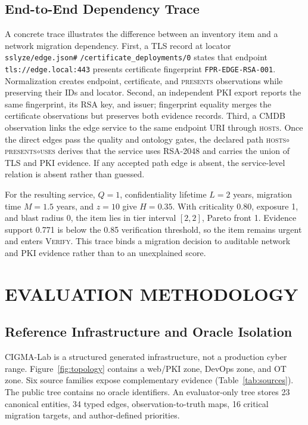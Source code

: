 \documentclass[a4paper,twoside]{article}
\newcommand{\rel}[1]{\textsc{#1}}          %
\newcommand{\verify}{\textsc{Verify}\xspace}
\begin{document}
\subsection{End-to-End Dependency Trace}

A concrete trace illustrates the difference between an inventory item and a network migration dependency. First, a TLS record at locator \texttt{sslyze/edge.json\#} \texttt{/certificate\_deployments/0} states that endpoint \texttt{tls://edge.local:443} presents certificate fingerprint \texttt{FPR-EDGE-RSA-001}. Normalization creates endpoint, certificate, and \rel{presents} observations while preserving their IDs and locator. Second, an independent PKI export reports the same fingerprint, its RSA key, and issuer; fingerprint equality merges the certificate observations but preserves both evidence records. Third, a CMDB observation links the edge service to the same endpoint URI through \rel{hosts}. Once the direct edges pass the quality and ontology gates, the declared path \rel{hosts}$\circ$\rel{presents}$\circ$\rel{uses} derives that the service uses RSA-2048 and carries the union of TLS and PKI evidence. If any accepted path edge is absent, the service-level relation is absent rather than guessed.

For the resulting service, $Q=1$, confidentiality lifetime $L = 2$ years, migration time $M = 1.5$ years, and $z = 10$ give $H = 0.35$. With criticality 0.80, exposure 1, and blast radius 0, the item lies in tier interval $[2,2]$, Pareto front 1. Evidence support 0.771 is below the 0.85 verification threshold, so the item remains urgent and enters \verify. This trace binds a migration decision to auditable network and PKI evidence rather than to an unexplained score.

\section{\uppercase{Evaluation Methodology}}
\label{sec:method}

\subsection{Reference Infrastructure and Oracle Isolation}

CIGMA-Lab is a structured generated infrastructure, not a production cyber range. Figure~\ref{fig:topology} contains a web/PKI zone, DevOps zone, and OT zone. Six source families expose complementary evidence (Table~\ref{tab:sources}). The public tree contains no oracle identifiers. An evaluator-only tree stores 23 canonical entities, 34 typed edges, observation-to-truth maps, 16 critical migration targets, and author-defined priorities.
\end{document}
